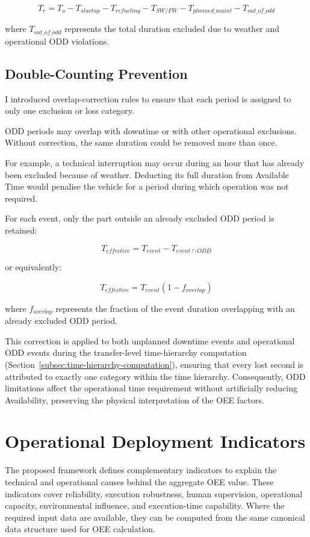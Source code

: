 \[
T_r = T_o - T_{startup} - T_{refueling} - T_{SW/FW} - T_{planned\_maint} - T_{out\_of\_odd}
\]

where $T_{out\_of\_odd}$ represents the total duration excluded due to weather and operational ODD violations.

\subsection{Double-Counting Prevention}

I introduced overlap-correction rules to ensure that each period is assigned to only one exclusion or loss category.

ODD periods may overlap with downtime or with other operational exclusions. Without correction, the same duration could be removed more than once.

For example, a technical interruption may occur during an hour that has already been excluded because of weather. Deducting its full duration from Available Time would penalise the vehicle for a period during which operation was not required.

For each event, only the part outside an already excluded ODD period is retained:

\[
T_{effective} = T_{event} - T_{event \cap ODD}
\]

or equivalently:

\[
T_{effective} = T_{event}(1 - f_{overlap})
\]

where $f_{overlap}$ represents the fraction of the event duration overlapping with an already excluded ODD period.

This correction is applied to both unplanned downtime events and operational ODD events during the transfer-level time-hierarchy computation (Section~\ref{subsec:time-hierarchy-computation}), ensuring that every lost second is attributed to exactly one category within the time hierarchy. Consequently, ODD limitations affect the operational time requirement without artificially reducing Availability, preserving the physical interpretation of the OEE factors.

\section{Operational Deployment Indicators}

The proposed framework defines complementary indicators to explain the technical and operational causes behind the aggregate OEE value. These indicators cover reliability, execution robustness, human supervision, operational capacity, environmental influence, and execution-time capability. Where the required input data are available, they can be computed from the same canonical data structure used for OEE calculation.

